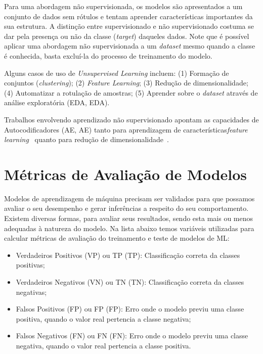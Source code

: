 Para uma abordagem não supervisionada, os modelos são apresentados a um conjunto de dados sem rótulos e tentam aprender características importantes da sua estrutura. A distinção entre supervisionado e não supervisionado costuma se dar pela presença ou não da classe (\textit{target}) daqueles dados. Note que é possível aplicar uma abordagem não supervisionada a um \textit{dataset} mesmo quando a classe é conhecida, basta excluí-la do processo de treinamento do modelo.

Alguns casos de uso de \textit{Unsupervised Learning} incluem: (1) Formação de conjuntos (\textit{clustering}); (2) \textit{Feature Learning}; (3) Redução de dimensionalidade; (4) Automatizar a rotulação de amostras; (5) Aprender sobre o \textit{dataset} através de análise exploratória (\acrlong{EDA}, \acrshort{EDA}).

Trabalhos envolvendo aprendizado não supervisionado apontam as capacidades de Autocodificadores (\acrlong{AE}, \acrshort{AE}) tanto para aprendizagem de características\textit{feature learning}~\cite{35.16, 35.17} quanto para redução de dimensionalidade~\cite{35.18, 35.19}.


\section{Métricas de Avaliação de Modelos}\label{sec:metricas}

Modelos de aprendizagem de máquina precisam ser validados para que possamos avaliar o seu desempenho e gerar inferências a respeito do seu comportamento. Existem diversas formas, para avaliar seus resultados, sendo esta mais ou menos adequadas à natureza do modelo. Na lista abaixo temos variáveis utilizadas para calcular métricas de avaliação do treinamento e teste de modelos de \acrshort{ML}:

\begin{itemize}
    \item Verdadeiros Positivos (VP) ou \acrlong{TP} (\acrshort{TP}): Classificação correta da classes positivas;
    \item Verdadeiros Negativos (VN) ou \acrlong{TN} (\acrshort{TN}): Classificação correta da classes negativas;
    \item Falsos Positivos (FP) ou \acrlong{FP} (\acrshort{FP}): Erro onde o modelo previu uma classe positiva, quando o valor real pertencia a classe negativa;
    \item Falsos Negativos (FN) ou \acrlong{FN} (\acrshort{FN}): Erro onde o modelo previu uma classe negativa, quando o valor real pertencia a classe positiva.
\end{itemize}

